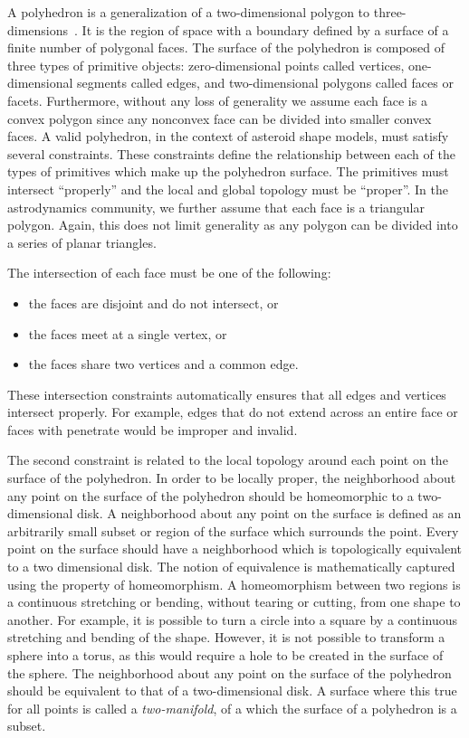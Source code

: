 A polyhedron is a generalization of a two-dimensional polygon to three-dimensions~\cite{orourke1998}.
It is the region of space with a boundary defined by a surface of a finite number of polygonal faces.
The surface of the polyhedron is composed of three types of primitive objects: zero-dimensional points called vertices, one-dimensional segments called edges, and two-dimensional polygons called faces or facets.
Furthermore, without any loss of generality we assume each face is a convex polygon since any nonconvex face can be divided into smaller convex faces.
A valid polyhedron, in the context of asteroid shape models, must satisfy several constraints.
These constraints define the relationship between each of the types of primitives which make up the polyhedron surface.
The primitives must intersect ``properly'' and the local and global topology must be ``proper''.
In the astrodynamics community, we further assume that each face is a triangular polygon.
Again, this does not limit generality as any polygon can be divided into a series of planar triangles.

The intersection of each face must be one of the following:
\begin{itemize}
    \item the faces are disjoint and do not intersect, or
    \item the faces meet at a single vertex, or
    \item the faces share two vertices and a common edge.
\end{itemize}
These intersection constraints automatically ensures that all edges and vertices intersect properly.
For example, edges that do not extend across an entire face or faces with penetrate would be improper and invalid.

The second constraint is related to the local topology around each point on the surface of the polyhedron.
In order to be locally proper, the neighborhood about any point on the surface of the polyhedron should be homeomorphic to a two-dimensional disk.
A neighborhood about any point on the surface is defined as an arbitrarily small subset or region of the surface which surrounds the point.
Every point on the surface should have a neighborhood which is topologically equivalent to a two dimensional disk.
The notion of equivalence is mathematically captured using the property of homeomorphism.
A homeomorphism between two regions is a continuous stretching or bending, without tearing or cutting, from one shape to another.
For example, it is possible to turn a circle into a square by a continuous stretching and bending of the shape.
However, it is not possible to transform a sphere into a torus, as this would require a hole to be created in the surface of the sphere.
The neighborhood about any point on the surface of the polyhedron should be equivalent to that of a two-dimensional disk.
A surface where this true for all points is called a \textit{two-manifold}, of a which the surface of a polyhedron is a subset.

